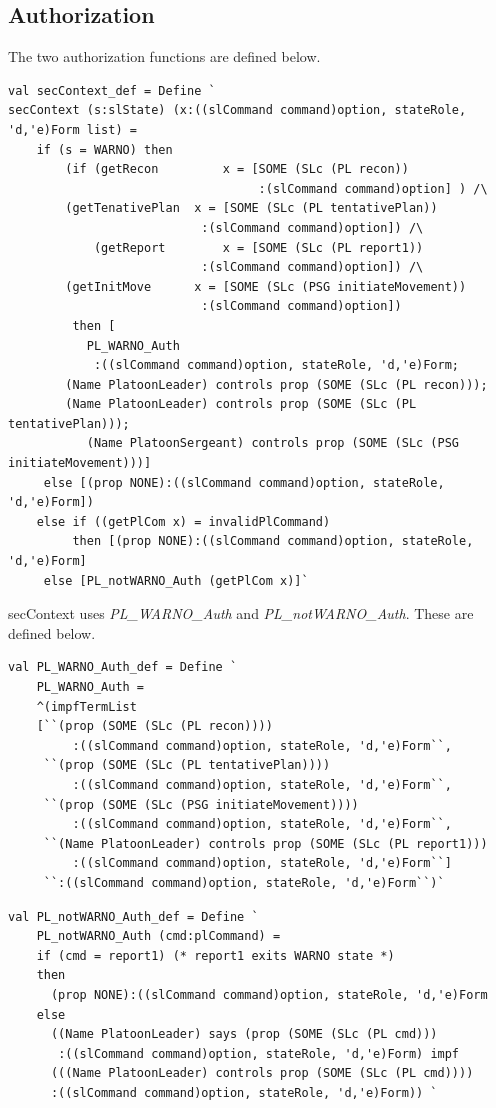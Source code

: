 \documentclass[../../main/main.tex]{subfiles}
\begin{document}
\subsection{Authorization}
The two authorization functions are defined below.

\begin{lstlisting}
val secContext_def = Define `
secContext (s:slState) (x:((slCommand command)option, stateRole, 'd,'e)Form list) =
    if (s = WARNO) then
        (if (getRecon         x = [SOME (SLc (PL recon))
                                   :(slCommand command)option] ) /\
	    (getTenativePlan  x = [SOME (SLc (PL tentativePlan))
	    		      	   :(slCommand command)option]) /\
            (getReport        x = [SOME (SLc (PL report1))
	    		      	   :(slCommand command)option]) /\
	    (getInitMove      x = [SOME (SLc (PSG initiateMovement))
	    		      	   :(slCommand command)option])
         then [
	       PL_WARNO_Auth
	        :((slCommand command)option, stateRole, 'd,'e)Form;
		(Name PlatoonLeader) controls prop (SOME (SLc (PL recon)));
		(Name PlatoonLeader) controls prop (SOME (SLc (PL tentativePlan)));
	       (Name PlatoonSergeant) controls prop (SOME (SLc (PSG initiateMovement)))]
	 else [(prop NONE):((slCommand command)option, stateRole, 'd,'e)Form])
    else if ((getPlCom x) = invalidPlCommand)
    	 then [(prop NONE):((slCommand command)option, stateRole, 'd,'e)Form]
	 else [PL_notWARNO_Auth (getPlCom x)]`
\end{lstlisting}

secContext uses \textit{PL_WARNO_Auth} and \textit{PL_notWARNO_Auth}. These are defined below.


\begin{lstlisting}
val PL_WARNO_Auth_def = Define `
    PL_WARNO_Auth =
    ^(impfTermList
    [``(prop (SOME (SLc (PL recon))))
         :((slCommand command)option, stateRole, 'd,'e)Form``,
     ``(prop (SOME (SLc (PL tentativePlan))))
         :((slCommand command)option, stateRole, 'd,'e)Form``,
     ``(prop (SOME (SLc (PSG initiateMovement))))
         :((slCommand command)option, stateRole, 'd,'e)Form``,
     ``(Name PlatoonLeader) controls prop (SOME (SLc (PL report1)))
         :((slCommand command)option, stateRole, 'd,'e)Form``]
     ``:((slCommand command)option, stateRole, 'd,'e)Form``)`
\end{lstlisting}


\begin{lstlisting}
val PL_notWARNO_Auth_def = Define `
    PL_notWARNO_Auth (cmd:plCommand) =
    if (cmd = report1) (* report1 exits WARNO state *)
    then
      (prop NONE):((slCommand command)option, stateRole, 'd,'e)Form
    else
      ((Name PlatoonLeader) says (prop (SOME (SLc (PL cmd)))
       :((slCommand command)option, stateRole, 'd,'e)Form) impf
      (((Name PlatoonLeader) controls prop (SOME (SLc (PL cmd))))
      :((slCommand command)option, stateRole, 'd,'e)Form)) `
\end{lstlisting}
\end{document}
